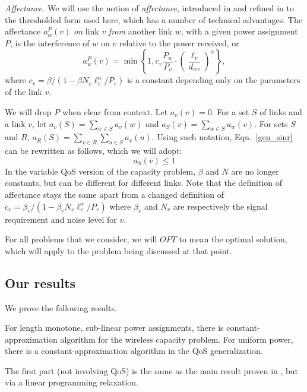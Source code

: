 \documentclass[11pt]{amsart}
\begin{document}
\emph{Affectance. }
We will use the notion of \emph{affectance}, introduced in
\cite{GHWW09,HW09} and refined in \cite{KV10} to the thresholded form
used here, which has a number of
technical advantages.  
The affectance $a^P_w(v)$ \emph{on} link $v$ \emph{from} another link $w$,
with a given power assignment $P$,
is the interference of $w$ on $v$ relative to the power
received, or
\[
a^P_{w}(v)      
     = \min\left\{1, c_v \frac{P_w}{P_v} \cdot \left(\frac{\ell_v}{d_{wv}}\right)^\alpha\right\},
\]
where $c_v = \beta/(1 - \beta N_v \ell_v^\alpha/P_v)$ is a constant
depending only on the parameters of the link $v$. 

We will drop $P$ when clear from context. 
Let $a_v(v) = 0$.
For a set $S$ of links and a link $v$, 
let $a_v(S) = \sum_{w \in S} a_v(w)$ and $a_S(v) = \sum_{w \in S} a_w(v)$.
For sets $S$ and $R$, $a_R(S) = \sum_{v \in R}\sum_{u \in S} a_v(u)$.
Using such notation, Eqn.~\ref{gen_sinr} can be rewritten as follows, which we will adopt:
\begin{equation}
a_S(v) \leq 1
\end{equation}
In the variable QoS version of the capacity problem, $\beta$ and $N$ are no longer constants, but can be different for different links.
Note that the definition of affectance stays the same apart from a changed definition of $c_v = \beta_v/(1 - \beta_v N_v \ell_v^\alpha/P_v)$ where $\beta_v$ and $N_v$ are respectively the signal requirement and noise level for $v$.

For all problems that we consider, we will $OPT$ to mean the optimal solution, which will apply to the problem being discussed at that point.

\subsection*{Our results}
We prove the following results.
\begin{theorem}
For length monotone, sub-linear power assignments, there is constant-approximation algorithm for the wireless capacity problem. For uniform power, there is a constant-approximation algorithm in the QoS generalization.
\label{mainth1}
\end{theorem}
The first part (not involving QoS) is the same as the main result proven in \cite{SODA11}, but via a linear programming relaxation.
\end{document}
